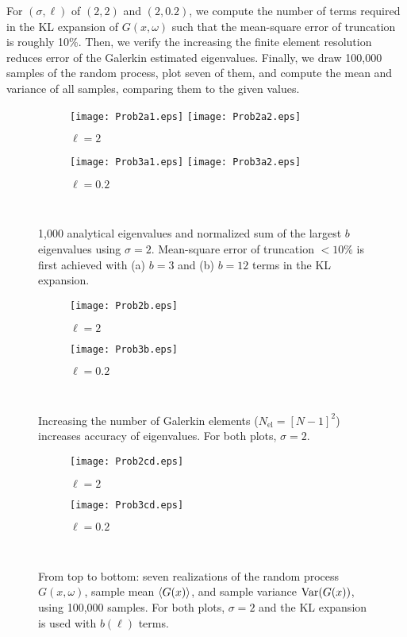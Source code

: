 \documentclass[11pt]{article}
\begin{document}
For $(\sigma, \ell)$ of $(2,2)$ and $(2,0.2)$, we compute the number of terms required in the KL expansion of $G(x,\omega)$ such that the mean-square error of truncation is roughly 10\%. Then, we verify the increasing the finite element resolution reduces error of the Galerkin estimated eigenvalues. Finally, we draw 100,000 samples of the random process, plot seven of them, and compute the mean and variance of all samples, comparing them to the given values.

\begin{figure}
\centering
\begin{subfigure}{0.49\textwidth}
\texttt{[image: Prob2a1.eps]}
\texttt{[image: Prob2a2.eps]}
\caption{$\ell=2$}
\end{subfigure}
\begin{subfigure}{0.49\textwidth}
\texttt{[image: Prob3a1.eps]}
\texttt{[image: Prob3a2.eps]}
\caption{$\ell=0.2$}
\end{subfigure}
\\[0.2cm]
\caption{1,000 analytical eigenvalues and normalized sum of the largest $b$ eigenvalues using $\sigma = 2$. Mean-square error of truncation $<10\%$ is first achieved with (a) $b=3$ and (b) $b=12$ terms in the KL expansion.}
\label{fig:analytical_eigs}
\end{figure}

\begin{figure}
\centering
\begin{subfigure}{0.49\textwidth}
\texttt{[image: Prob2b.eps]}
\caption{$\ell=2$}
\end{subfigure}
\begin{subfigure}{0.49\textwidth}
\texttt{[image: Prob3b.eps]}
\caption{$\ell=0.2$}
\end{subfigure}
\\[0.2cm]
\caption{Increasing the number of Galerkin elements ($N_\text{el}=[N-1]^2$) increases accuracy of eigenvalues. For both plots, $\sigma=2$.}
\label{fig:error_reduction}
\end{figure}

\begin{figure}
\centering
\begin{subfigure}{0.49\textwidth}
\texttt{[image: Prob2cd.eps]}
\caption{$\ell=2$}
\end{subfigure}
\begin{subfigure}{0.49\textwidth}
\texttt{[image: Prob3cd.eps]}
\caption{$\ell=0.2$}
\end{subfigure}
\\[0.2cm]
\caption{From top to bottom: seven realizations of the random process $G(x,\omega)$, sample mean $\left\langle G(x) \right\rangle$, and sample variance $\operatorname{Var}(G(x))$, using 100,000 samples. For both plots, $\sigma=2$ and the KL expansion is used with $b(\ell)$ terms.}
\label{fig:realizations}
\end{figure}
\end{document}
